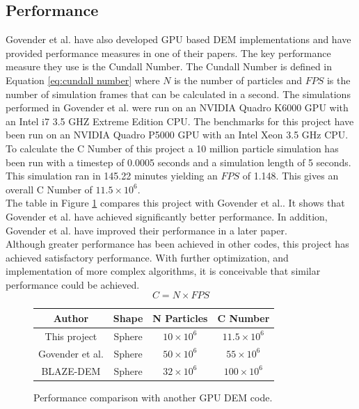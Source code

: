 \documentclass[10pt,a4paper,titlepage]{report}
\begin{document}
\subsection{Performance}
Govender et al. have also developed GPU based DEM implementations and have provided performance measures in one of their papers\cite{performance}. The key performance measure they use is the Cundall Number. The Cundall Number is defined in Equation \ref{eq:cundall number} where $N$ is the number of particles and $FPS$ is the number of simulation frames that can be calculated in a second. The simulations performed in Govender et al.\cite{performance} were run on an NVIDIA Quadro K6000 GPU with an Intel i7 3.5 GHZ Extreme Edition CPU. The benchmarks for this project have been run on an NVIDIA Quadro P5000 GPU with an  Intel Xeon 3.5 GHz CPU.
\\To calculate the C Number of this project a 10 million particle simulation has been run with a timestep of 0.0005 seconds and a simulation length of 5 seconds. This simulation ran in 145.22 minutes yielding an $FPS$ of 1.148. This gives an overall C Number of $11.5 \times 10^6$.
\\The table in Figure \ref{fig:performance comparison} compares this project with Govender et al.\cite{performance}. It shows that Govender et al. have achieved significantly better performance. In addition, Govender et al. have improved their performance in a later paper\cite{blazedem}.
\\Although greater performance has been achieved in other codes, this project has achieved satisfactory performance. With further optimization, and implementation of more complex algorithms, it is conceivable that similar performance could be achieved.
\begin{equation}
C = N \times FPS
\label{eq:cundall number}
\end{equation}

\begin{figure}
\begin{center}
\begin{tabular}{|c c c c|}
\hline
Author & Shape & N Particles & C Number\\
\hline
This project & Sphere & $10 \times 10^6$ & $11.5 \times 10^6$ \\
Govender et al.\cite{performance} & Sphere & $50 \times 10^6$ & $55 \times 10^6$ \\
BLAZE-DEM\cite{blazedem} & Sphere & $32 \times 10^6$ & $100 \times 10^6$ \\
\hline
\end{tabular}
\end{center}
\caption{Performance comparison with another GPU DEM code.}
\label{fig:performance comparison}
\end{figure}
\end{document}
